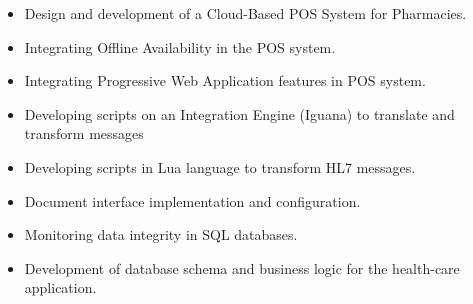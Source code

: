 \documentclass[10pt,a4paper,ragged2e]{altacv}
\begin{document}
\vspace{10px}

\begin{itemize}
    \item Design and development of a Cloud-Based POS System for Pharmacies.
    \item Integrating Offline Availability in the POS system.
    \item Integrating Progressive Web Application features in POS system.
\end{itemize}

\vspace{10px}

\begin{itemize}
    \item Developing scripts on an Integration Engine (Iguana) to translate and transform messages
    \item Developing scripts in Lua language to transform HL7 messages.
    \item Document interface implementation and configuration.
    \item Monitoring data integrity in SQL databases.
    \item Development of database schema and business logic for the health-care application.
\end{itemize}


\vspace{10px}



\clearpage
\end{document}
